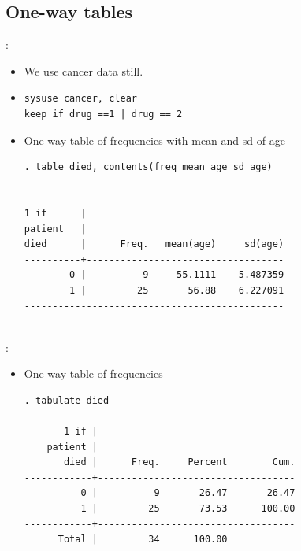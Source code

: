 \subsection{One-way tables}
\begin{frame}[fragile]{\secname: \subsecname}
\begin{itemize}	
	\item<1|handout:1-> We use cancer data still.
	\item<1|handout:1->[]
\begin{verbatim}
sysuse cancer, clear
keep if drug ==1 | drug == 2	
 \end{verbatim}
\item<2|handout:2-> One-way table of frequencies with mean and sd of age
\begin{verbatim}
. table died, contents(freq mean age sd age)

----------------------------------------------
1 if      |
patient   |
died      |      Freq.   mean(age)     sd(age)
----------+-----------------------------------
        0 |          9     55.1111    5.487359
        1 |         25       56.88    6.227091
----------------------------------------------


 \end{verbatim}

\end{itemize}
\end{frame}
\begin{frame}[fragile]{\secname: \subsecname}
\begin{itemize}	
\item One-way table of frequencies
\begin{verbatim}
. tabulate died

       1 if |
    patient |
       died |      Freq.     Percent        Cum.
------------+-----------------------------------
          0 |          9       26.47       26.47
          1 |         25       73.53      100.00
------------+-----------------------------------
      Total |         34      100.00
	
\end{verbatim}
\end{itemize}
\end{frame}

